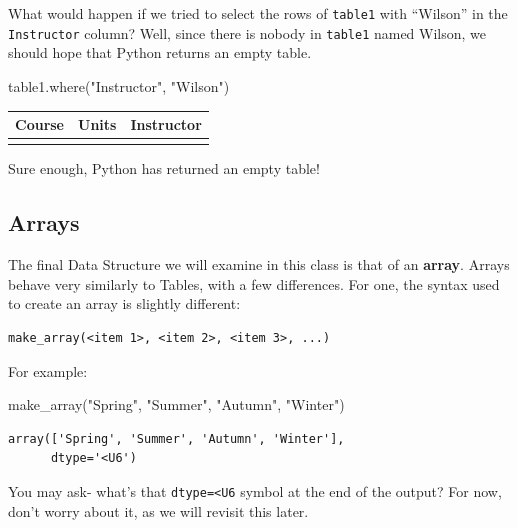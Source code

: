 \documentclass[
  11pt,
]{article}
\newenvironment{Shaded}{\begin{snugshade}}{\end{snugshade}}
\newcommand{\NormalTok}[1]{\textcolor[rgb]{0.00,0.23,0.31}{#1}}
\newcommand{\StringTok}[1]{\textcolor[rgb]{0.13,0.47,0.30}{#1}}
\begin{document}
What would happen if we tried to select the rows of \texttt{table1} with
``Wilson'' in the \texttt{Instructor} column? Well, since there is
nobody in \texttt{table1} named Wilson, we should hope that Python
returns an empty table.

\begin{Shaded}
\begin{Highlighting}[]
\NormalTok{table1.where(}\StringTok{"Instructor"}\NormalTok{, }\StringTok{"Wilson"}\NormalTok{)}
\end{Highlighting}
\end{Shaded}

\begin{longtable}[]{@{}lll@{}}
\toprule\noalign{}
Course & Units & Instructor \\
\midrule\noalign{}
\endhead
\bottomrule\noalign{}
\endlastfoot
\end{longtable}

Sure enough, Python has returned an empty table!

\subsection{Arrays}\label{arrays}

The final Data Structure we will examine in this class is that of an
\textbf{array}. Arrays behave very similarly to Tables, with a few
differences. For one, the syntax used to create an array is slightly
different:

\begin{verbatim}
make_array(<item 1>, <item 2>, <item 3>, ...)
\end{verbatim}

For example:

\begin{Shaded}
\begin{Highlighting}[]
\NormalTok{make\_array(}\StringTok{"Spring"}\NormalTok{, }\StringTok{"Summer"}\NormalTok{, }\StringTok{"Autumn"}\NormalTok{, }\StringTok{"Winter"}\NormalTok{)}
\end{Highlighting}
\end{Shaded}

\begin{verbatim}
array(['Spring', 'Summer', 'Autumn', 'Winter'],
      dtype='<U6')
\end{verbatim}

You may ask- what's that
\texttt{dtype=\textquotesingle{}\textless{}U6\textquotesingle{}} symbol
at the end of the output? For now, don't worry about it, as we will
revisit this later.
\end{document}

